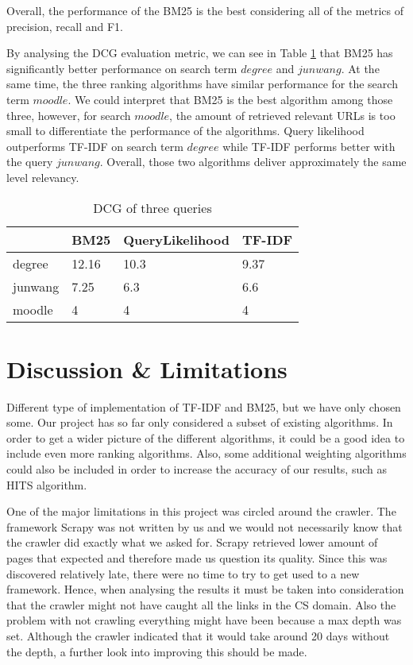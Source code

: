 Overall, the performance of the BM25 is the best considering all of the metrics of precision, recall and F1. 

By analysing the DCG evaluation metric, we can see in Table \ref{tab:dcg} that BM25 has significantly better performance on search term $degree$ and $jun wang$. At the same time, the three ranking algorithms have similar performance for the search term $moodle$. We could interpret that BM25 is the best algorithm among those three, however, for search $moodle$, the amount of retrieved relevant URLs is too small to differentiate the performance of the algorithms. Query likelihood outperforms TF-IDF on search term $degree$ while TF-IDF performs better with the query $jun wang$. Overall, those two algorithms deliver approximately the same level relevancy.


\begin{table}[]
\centering
\caption{DCG of three queries}
\label{tab:dcg}
\begin{tabular}{|l|l|l|l|}
\hline
        & BM25  & QueryLikelihood & TF-IDF \\ \hline
degree  & 12.16 & 10.3            & 9.37   \\ \hline
junwang & 7.25  & 6.3             & 6.6    \\ \hline
moodle  & 4     & 4               & 4      \\ \hline
\end{tabular}
\end{table}



\section{Discussion \& Limitations} %
\label{sec:discussion_&_limitations}

Different type of implementation of TF-IDF and BM25, but we have only chosen some. 
Our project has so far only considered a subset of existing algorithms. In order to get a wider picture of the different algorithms, it could be a good idea to include even more ranking algorithms. Also, some additional weighting algorithms could also be included in order to increase the accuracy of our results, such as HITS algorithm.

One of the major limitations in this project was circled around the crawler. The framework Scrapy was not written by us and we would not necessarily know that the crawler did exactly what we asked for. Scrapy retrieved lower amount of pages that expected and therefore made us question its quality. Since this was discovered relatively late, there were no time to try to get used to a new framework. Hence, when analysing the results it must be taken into consideration that the crawler might not have caught all the links in the CS domain. Also the problem with not crawling everything might have been because a max depth was set. Although the crawler indicated that it would take around 20 days without the depth, a further look into improving this should be made.

